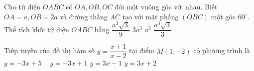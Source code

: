 \begin{ex}%
	Cho tứ diện $OABC$  có $OA,OB,OC$ đôi một vuông góc với nhau. Biết $OA=a,OB=2a$ và đường thẳng $AC$  tạo với mặt phẳng $(OBC)$ một góc $60^\circ.$ Thể tích khối tứ diện  $OABC$ bằng
	\choice
	{\True $\dfrac{a^3\sqrt{3}}{9}$}
	{$3a^3$}
	{$a^3$}
	{$\dfrac{a^3\sqrt{3}}{3}$}
\end{ex}
\begin{ex}%
	Tiếp tuyến của đồ thị hàm số $y=\dfrac{x+1}{x-2}$ tại điểm $M\left(1;-2\right)$ có phương trình là 
	\choice
	{$y=-3x+5$}
	{\True~ $y=-3x+1$}
	{$y=3x-1$}
	{$y=3x+2$}
\end{ex}


